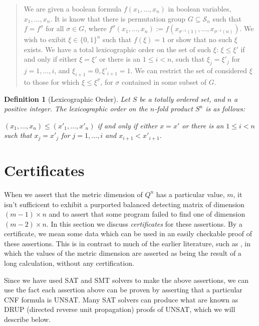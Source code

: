 \documentclass{article}
\newcommand{\cS}{\mathcal{S}}
\newtheorem{definition}{Definition}
\begin{document}
\begin{quotation}
  We are given a boolean formula $f(x_1, \dots, x_n)$ in boolean
  variables, $x_1, \dots, x_n$.  It is know that there is permutation
  group $G \subseteq \cS_n$ such that $f = f^\sigma$ for all
  $\sigma \in G$, where
  $f^\sigma(x_1, \dots, x_n) := f(x_{\sigma^{-1}(1)}, \dots,
  x_{\sigma^{-1}(n)})$.  We wish to exibit $\xi \in \{0,1\}^n$ such
  that $f(\xi) = 1$ or show that no such $\xi$ exists.  We have a
  total lexicographic order on the set of such $\xi$: $\xi \le \xi'$
  if and only if either $\xi = \xi'$ or there is an $1 \le i < n$,
  such that $\xi_j = \xi'_j$ for $j=1, \dots, i$, and
  $\xi_{i+1} = 0, \xi'_{i+1} = 1$.  We can restrict the set of
  considered $\xi$ to those for which $\xi \le \xi^\sigma$, for
  $\sigma$ contained in some subset of $G$.
\end{quotation}
\begin{definition}[Lexicographic Order]
  Let $S$ be a totally ordered set, and $n$ a positive integer.  The
  \emph{lexicographic order} on the $n$-fold product $S^n$ is as
  follows:

  $(x_1, \dots, x_n) \le (x'_1, \dots, x'_n)$ if and only if either $x
  = x'$ or there is an $1 \le i < n$ such that $x_j = x'_j$ for $j=1,
  \dots, i$ and $x_{i+1} < x'_{i+1}$.
\end{definition}
\section{Certificates}
\label{sec:certificates}

When we assert that the metric dimension of $Q^n$ has a particular
value, $m$, it isn't sufficicent to exhibit a purported balanced
detecting matrix of dimension $(m-1) \times n$ and to assert that some
program failed to find one of dimension $(m-2) \times n$.  In this
section we discuss \emph{certificates} for these assertions.  By a
certificate, we mean some data which can be used in an easily
checkable proof of these assertions.  This is in contrast to much of
the earlier literature, such as \cite{beardon2013resolving}, in which
the values of the metric dimension are asserted as being the result of
a long calculation, without any certification.

Since we have used SAT and SMT solvers to make the above assertions,
we can use the fact each assertion above can be proven by asserting
that a particular CNF formula is UNSAT.  Many SAT solvers can produce
what are known as DRUP (directed reverse unit propagation) proofs of
UNSAT, which we will describe below.
\end{document}
